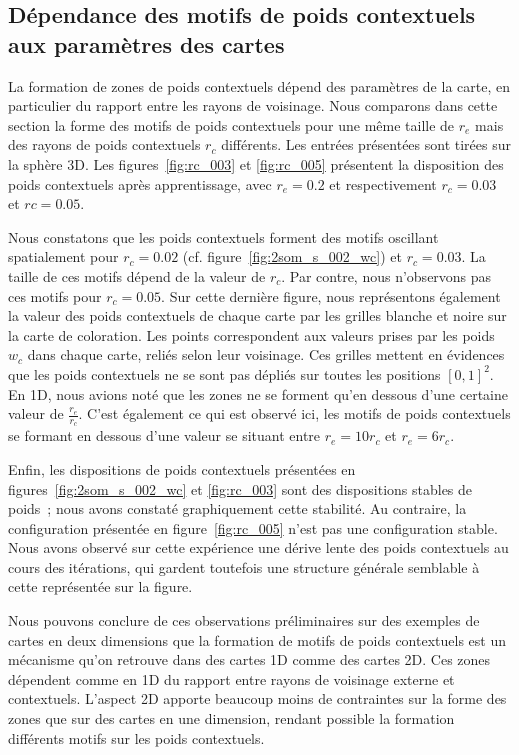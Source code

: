 \documentclass[../main]{subfiles}
\begin{document}
\subsection{Dépendance des motifs de poids contextuels aux paramètres des cartes \label{par:params2D}}

La formation de zones de poids contextuels dépend des paramètres de la carte, en particulier du rapport entre les rayons de voisinage.
Nous comparons dans cette section la forme des motifs de poids contextuels pour une même taille de $r_e$ mais des rayons de poids contextuels $r_c$ différents. Les entrées présentées sont tirées sur la sphère 3D.
Les figures~\ref{fig:rc_003} et \ref{fig:rc_005} présentent la disposition des poids contextuels après apprentissage, avec $r_e = 0.2$ et respectivement $r_c = 0.03$ et $rc = 0.05$.

Nous constatons que les poids contextuels forment des motifs oscillant spatialement pour $r_c = 0.02$ (cf. figure~\ref{fig:2som_s_002_wc}) et $r_c = 0.03$. La taille de ces motifs dépend de la valeur de $r_c$. Par contre, nous n'observons pas ces motifs pour $r_c = 0.05$.
Sur cette dernière figure, nous représentons également la valeur des poids contextuels de chaque carte par les grilles blanche et noire sur la carte de coloration. Les points  correspondent aux valeurs prises par les poids $w_c$ dans chaque carte, reliés selon leur voisinage.
Ces grilles mettent en évidences que les poids contextuels ne se sont pas dépliés sur toutes les positions $[0,1]^2$. En 1D, nous avions noté que les zones ne se forment qu'en dessous d'une certaine valeur de $\frac{r_e}{r_c}$.
C'est également ce qui est observé ici, les motifs de poids contextuels se formant en dessous d'une valeur se situant entre $r_e = 10 r_c$ et $r_e = 6 r_c$.

Enfin, les dispositions de poids contextuels présentées en figures~\ref{fig:2som_s_002_wc} et \ref{fig:rc_003} sont des dispositions stables de poids~; nous avons constaté graphiquement cette stabilité. Au contraire, la configuration présentée en figure~\ref{fig:rc_005} n'est pas une configuration stable. Nous avons observé sur cette expérience une dérive lente des poids contextuels au cours des itérations, qui gardent toutefois une structure générale semblable à cette représentée sur la figure.

Nous pouvons conclure de ces observations préliminaires sur des exemples de cartes en deux dimensions que la formation de motifs de poids contextuels est un mécanisme qu'on retrouve dans des cartes 1D comme des cartes 2D. 
Ces zones dépendent comme en 1D du rapport entre rayons de voisinage externe et contextuels.
L'aspect 2D apporte beaucoup moins de contraintes sur la forme des zones que sur des cartes en une dimension, rendant possible la formation différents motifs sur les poids contextuels.
\end{document}
